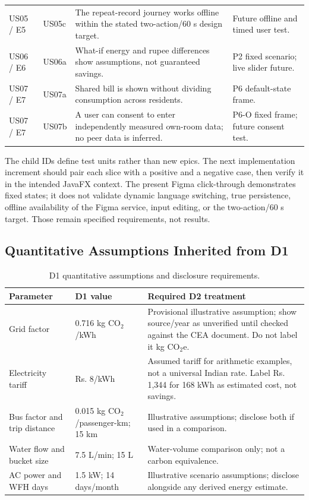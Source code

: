 \documentclass[12pt,a4paper]{article}
\begin{document}
\begin{table}[H]
\begin{tabularx}{\textwidth}{@{}p{1.27cm}p{1.18cm}>{\raggedright\arraybackslash}X>{\raggedright\arraybackslash}p{3.0cm}@{}}
US05 / E5 & US05c & The repeat-record journey works offline within the stated two-action/60 s design target. & Future offline and timed user test.\\
\rowcolor{RowGray}
US06 / E6 & US06a & What-if energy and rupee differences show assumptions, not guaranteed savings. & P2 fixed scenario; live slider future.\\
US07 / E7 & US07a & Shared bill is shown without dividing consumption across residents. & P6 default-state frame.\\
\rowcolor{RowGray}
US07 / E7 & US07b & A user can consent to enter independently measured own-room data; no peer data is inferred. & P6-O fixed frame; future consent test.\\
\bottomrule
\end{tabularx}
\end{table}

The child IDs define test units rather than new epics. The next implementation increment should pair each slice with a positive and a negative case, then verify it in the intended JavaFX context. The present Figma click-through demonstrates fixed states; it does not validate dynamic language switching, true persistence, offline availability of the Figma service, input editing, or the two-action/60 s target. Those remain specified requirements, not results.

\subsection{Quantitative Assumptions Inherited from D1}
\begin{table}[H]
\centering
\small
\caption{D1 quantitative assumptions and disclosure requirements.}
\begin{tabularx}{\textwidth}{@{}p{3.1cm}p{3.2cm}X@{}}
\toprule
\textbf{Parameter} & \textbf{D1 value} & \textbf{Required D2 treatment}\\
\midrule
Grid factor & 0.716 kg CO$_2$/kWh & Provisional illustrative assumption; show source/year as unverified until checked against the CEA document. Do not label it kg CO$_2$e.\\
Electricity tariff & Rs. 8/kWh & Assumed tariff for arithmetic examples, not a universal Indian rate. Label Rs. 1,344 for 168 kWh as estimated cost, not savings.\\
Bus factor and trip distance & 0.015 kg CO$_2$/passenger-km; 15 km & Illustrative assumptions; disclose both if used in a comparison.\\
Water flow and bucket size & 7.5 L/min; 15 L & Water-volume comparison only; not a carbon equivalence.\\
AC power and WFH days & 1.5 kW; 14 days/month & Illustrative scenario assumptions; disclose alongside any derived energy estimate.\\
\bottomrule
\end{tabularx}
\end{table}
\end{document}

